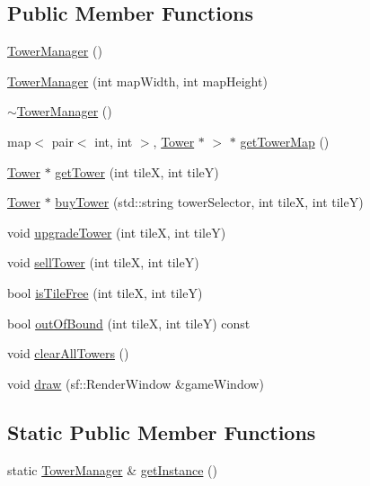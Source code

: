 \subsection*{Public Member Functions}
\begin{DoxyCompactItemize}
\item 
\hyperlink{class_tower_manager_ae42500401ee01f89fc2ac583f167af3b}{Tower\+Manager} ()
\item 
\hyperlink{class_tower_manager_ab8e7bf7431e7e9aeb105ee7f63841035}{Tower\+Manager} (int map\+Width, int map\+Height)
\item 
\hyperlink{class_tower_manager_aa2c2765238a8747803334c164e767e41}{$\sim$\+Tower\+Manager} ()
\item 
map$<$ pair$<$ int, int $>$, \hyperlink{class_tower}{Tower} $\ast$ $>$ $\ast$ \hyperlink{class_tower_manager_a3c54cdf57006efbcd9fc074f156d5360}{get\+Tower\+Map} ()
\item 
\hyperlink{class_tower}{Tower} $\ast$ \hyperlink{class_tower_manager_ae2cf2fc1dd19ced5d64ec74042673055}{get\+Tower} (int tile\+X, int tile\+Y)
\item 
\hyperlink{class_tower}{Tower} $\ast$ \hyperlink{class_tower_manager_a48859fff5518d39549e26d73633eb3c6}{buy\+Tower} (std\+::string tower\+Selector, int tile\+X, int tile\+Y)
\item 
void \hyperlink{class_tower_manager_aa74345499b531c211c0abf7b91eb96fc}{upgrade\+Tower} (int tile\+X, int tile\+Y)
\item 
void \hyperlink{class_tower_manager_afa7bbe1d178269f32df231807ab419d8}{sell\+Tower} (int tile\+X, int tile\+Y)
\item 
bool \hyperlink{class_tower_manager_afd9c7b3113dd4d02b0ee875d705cdf39}{is\+Tile\+Free} (int tile\+X, int tile\+Y)
\item 
bool \hyperlink{class_tower_manager_a0158f9210b43ea166977e01768849c3a}{out\+Of\+Bound} (int tile\+X, int tile\+Y) const 
\item 
void \hyperlink{class_tower_manager_ae71fc7c55f92477846760b122d0f60b9}{clear\+All\+Towers} ()
\item 
void \hyperlink{class_tower_manager_aa795de46937cdcb51d7a885d79c069b3}{draw} (sf\+::\+Render\+Window \&game\+Window)
\end{DoxyCompactItemize}
\subsection*{Static Public Member Functions}
\begin{DoxyCompactItemize}
\item 
static \hyperlink{class_tower_manager}{Tower\+Manager} \& \hyperlink{class_tower_manager_ad23044e56ca84962064cfcb9bee3adaf}{get\+Instance} ()
\end{DoxyCompactItemize}
